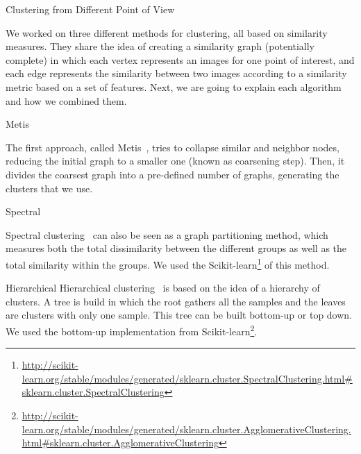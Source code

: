 
\begin{subsection}{Clustering from Different Point of View}

We worked on three different methods for clustering, all based on similarity measures.
They share the idea of creating a similarity graph (potentially complete) in which each vertex represents an images for one point of interest, and
each edge represents the similarity between two images according to a similarity metric based on a set of features.
Next, we are going to explain each algorithm and how we combined them.


\begin{subsubsection}{Metis}

The first approach, called Metis~\cite{metis},
tries to collapse similar and neighbor nodes, reducing the initial graph to a smaller one (known as coarsening step).
Then, it divides the coarsest graph into a pre-defined number of graphs, generating the clusters that we use.  

\end{subsubsection}

\begin{subsubsection}{Spectral}

Spectral clustering~\cite{spectral} can also be seen as a graph partitioning method, which measures both the total dissimilarity between the different groups 
as well as the total similarity within the groups. We used the Scikit-learn\footnote{\url{http://scikit-learn.org/stable/modules/generated/sklearn.cluster.SpectralClustering.html#sklearn.cluster.SpectralClustering}} of this method. 

\end{subsubsection}

\begin{subsubsection}{Hierarchical}
Hierarchical clustering~\cite{hierarchical} is based on the idea of a hierarchy of clusters. A tree is build in which the root gathers all the samples and the leaves are clusters with only one sample. This tree can be built bottom-up or top down. We used the bottom-up implementation from Scikit-learn\footnote{\url{http://scikit-learn.org/stable/modules/generated/sklearn.cluster.AgglomerativeClustering.html#sklearn.cluster.AgglomerativeClustering}}.


\end{subsubsection}
\end{subsection}
